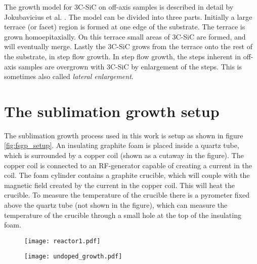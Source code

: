  The growth model for 3C-SiC on off-axis samples is described in detail by Jokubavicius et al. \cite{Jokubavicius2014}. The model can be divided into three parts. Initially a large terrace (or facet) region is formed at one edge of the substrate. The terrace is grown homoepitaxially. On this terrace small areas of 3C-SiC are formed, and will eventually merge. Lastly the 3C-SiC grows from the terrace onto the rest of the substrate, in step flow growth. In step flow growth, the steps inherent in off-axis samples are overgrown with 3C-SiC by enlargement of the steps. This is sometimes also called \emph{lateral enlargement}.
 
\section{The sublimation growth setup}
\label{sec:growth:fsgp}
The sublimation growth process used in this work is setup as shown in figure \ref{fig:fsgp_setup}. An insulating graphite foam is placed inside a quartz tube, which is surrounded by a copper coil (shown as a cutaway in the figure). The copper coil is connected to an RF-generator capable of creating a current in the coil. The foam cylinder contains a graphite crucible, which will couple with the magnetic field created by the current in the copper coil. This will heat the crucible. To measure the temperature of the crucible there is a pyrometer fixed above the quartz tube (not shown in the figure), which can measure the temperature of the crucible through a small hole at the top of the insulating foam. 

\begin{figure}[h]
\centering
\begin{minipage}{.5\textwidth}
  \centering
  \texttt{[image: reactor1.pdf]}
  \label{fig:fsgp_setup}
\end{minipage}%
\begin{minipage}{.5\textwidth}
  \centering
  \texttt{[image: undoped\_growth.pdf]}
  \label{fig:undoped_growth}
\end{minipage}
\end{figure}

